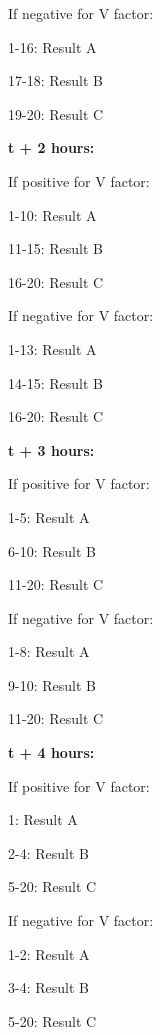 \documentclass[green]{guildcamp4}
\begin{document}
If negative for V factor:

1-16: Result A

17-18: Result B

19-20: Result C

{\bf t + 2 hours:}

If positive for V factor:

1-10: Result A

11-15: Result B

16-20: Result C

If negative for V factor:

1-13: Result A

14-15: Result B

16-20: Result C

{\bf t + 3 hours:}

If positive for V factor:

1-5: Result A

6-10: Result B

11-20: Result C

If negative for V factor:

1-8: Result A

9-10: Result B

11-20: Result C

{\bf t + 4 hours:}

If positive for V factor:

1: Result A

2-4: Result B

5-20: Result C

If negative for V factor:

1-2: Result A

3-4: Result B

5-20: Result C
\end{document}
